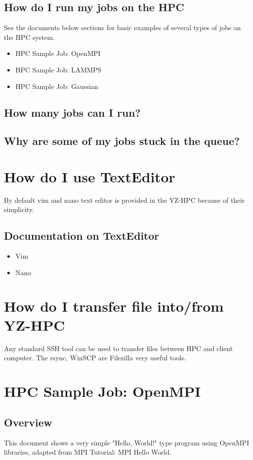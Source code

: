 \documentclass[11pt]{article}
\numberwithin{figure}{section}
\begin{document}
\subsection{How do I run my jobs on the HPC}
See the documents below sections for basic examples of several types of jobs on
the HPC system.

\begin{itemize}
    \item HPC Sample Job: OpenMPI
    \item HPC Sample Job: LAMMPS
    \item HPC Sample Job: Gaussian
\end{itemize}

\subsection{How many jobs can I run?}
\subsection{Why are some of my jobs stuck in the queue?}

\section{How do I use TextEditor}
By default vim and nano text editor is provided in the YZ-HPC because of their
simplicity.

\subsection{Documentation on TextEditor}
\begin{itemize}
    \item Vim
    \item Nano
\end{itemize}

\section{How do I transfer file into/from YZ-HPC}
Any standard SSH tool can be used to transfer files between HPC and client
computer. The rsync, WinSCP are Filezilla very useful tools.


\section{HPC Sample Job: OpenMPI}
\subsection{Overview}
This document shows a very simple "Hello, World!" type program using OpenMPI
libraries, adapted from MPI Tutorial: MPI Hello World.
\end{document}
